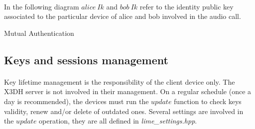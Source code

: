 \documentclass[a4paper,11pt]{article}
\begin{document}
    \paragraph{}In the following diagram $alice\ Ik$ and $bob\ Ik$ refer to the identity public key associated to the particular device of alice and bob involved in the audio call.\\\newline
    \begin{msc}{Mutual Authentication}
    \setlength{\instdist}{9cm}
    \setlength{\envinstdist}{2.5cm}
    \nextlevel
    \nextlevel
    \nextlevel[3]
    \nextlevel
    \nextlevel[2]
    \nextlevel[3]
    \end{msc}

  \subsection{Keys and sessions management}
    \paragraph{}Key lifetime management is the responsibility of the client device only. The X3DH server is not involved in their management. On a regular schedule (once a day is recommended), the devices must run the $update$ function to check keys validity, renew and/or delete of outdated ones. Several settings are involved in the $update$ operation, they are all defined in \textit{lime\_settings.hpp}.
    
\end{document}

